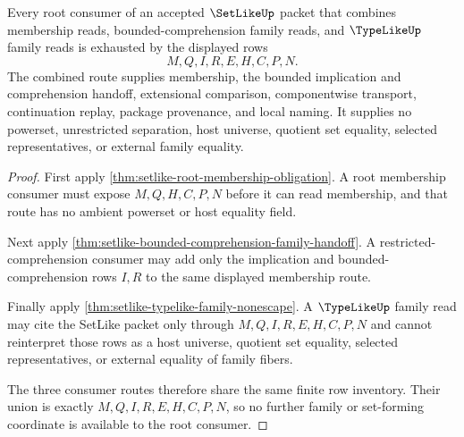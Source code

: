\begin{theorem}
\label{thm:setlike-root-membership-family-exhaustion}
Every root consumer of an accepted $\SetLikeUp$ packet that combines membership reads, bounded-comprehension family reads, and $\TypeLikeUp$ family reads is exhausted by the displayed rows
$$
M,Q,I,R,E,H,C,P,N .
$$
The combined route supplies membership, the bounded implication and comprehension handoff, extensional comparison, componentwise transport, continuation replay, package provenance, and local naming. It supplies no powerset, unrestricted separation, host universe, quotient set equality, selected representatives, or external family equality.
\end{theorem}
\begin{proof}
First apply \autoref{thm:setlike-root-membership-obligation}. A root membership consumer must expose $M,Q,H,C,P,N$ before it can read membership, and that route has no ambient powerset or host equality field.

Next apply \autoref{thm:setlike-bounded-comprehension-family-handoff}. A restricted-comprehension consumer may add only the implication and bounded-comprehension rows $I,R$ to the same displayed membership route.

Finally apply \autoref{thm:setlike-typelike-family-nonescape}. A $\TypeLikeUp$ family read may cite the SetLike packet only through $M,Q,I,R,E,H,C,P,N$ and cannot reinterpret those rows as a host universe, quotient set equality, selected representatives, or external equality of family fibers.

The three consumer routes therefore share the same finite row inventory. Their union is exactly $M,Q,I,R,E,H,C,P,N$, so no further family or set-forming coordinate is available to the root consumer.
\end{proof}
